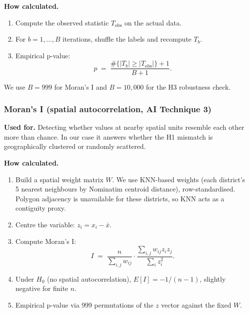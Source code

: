 \textbf{How calculated.}
\begin{enumerate}
  \item Compute the observed statistic $T_\text{obs}$ on the actual
        data.
  \item For $b = 1, \ldots, B$ iterations, shuffle the labels and
        recompute $T_b$.
  \item Empirical p-value:
        \begin{equation*}
          p \;=\; \frac{\#\{|T_b| \geq |T_\text{obs}|\} + 1}{B + 1}.
        \end{equation*}
\end{enumerate}

We use $B = 999$ for Moran's I and $B = 10{,}000$ for the H3
robustness check.

\subsubsection{Moran's I (spatial autocorrelation, AI Technique 3)}

\textbf{Used for.} Detecting whether values at nearby spatial units
resemble each other more than chance. In our case it answers whether
the H1 mismatch is geographically clustered or randomly scattered.

\textbf{How calculated.}

\begin{enumerate}
  \item Build a spatial weight matrix $W$. We use KNN-based weights
        (each district's 5 nearest neighbours by Nominatim centroid
        distance), row-standardised. Polygon adjacency is unavailable
        for these districts, so KNN acts as a contiguity proxy.
  \item Centre the variable: $z_i = x_i - \bar{x}$.
  \item Compute Moran's I:
        \begin{equation*}
          I \;=\; \frac{n}{\sum_{i,j} w_{ij}}
                  \cdot \frac{\sum_{i,j} w_{ij} z_i z_j}
                             {\sum_i z_i^2}.
        \end{equation*}
  \item Under $H_0$ (no spatial autocorrelation),
        $E[I] = -1/(n-1)$, slightly negative for finite $n$.
  \item Empirical p-value via 999 permutations of the $z$ vector
        against the fixed $W$.
\end{enumerate}

